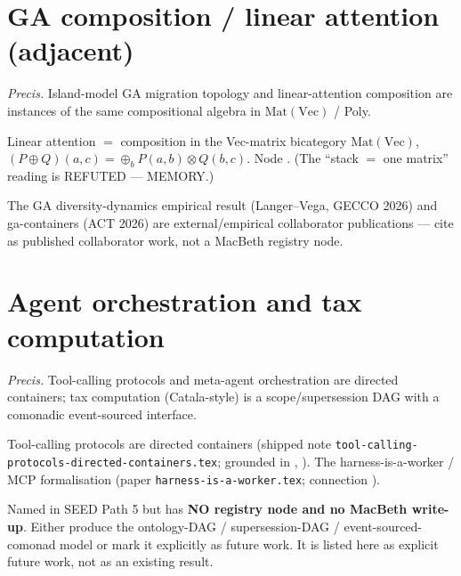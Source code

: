 \documentclass[11pt]{article}
\begin{document}
\section{GA composition / linear attention (adjacent)}
\emph{Precis.} Island-model GA migration topology and linear-attention composition are instances of
the same compositional algebra in $\mathrm{Mat}(\mathrm{Vec})$ / Poly.

\begin{theorem}
Linear attention $=$ composition in the Vec-matrix bicategory $\mathrm{Mat}(\mathrm{Vec})$,
$(P\oplus Q)(a,c)=\oplus_b P(a,b)\otimes Q(b,c)$. Node . (The
``stack $=$ one matrix'' reading is REFUTED --- MEMORY.)
\end{theorem}

\begin{remark}
The GA diversity-dynamics empirical result (Langer--Vega, GECCO 2026) and ga-containers (ACT 2026)
are external/empirical collaborator publications --- cite as published collaborator work, not a
MacBeth registry node.
\end{remark}

\section{Agent orchestration and tax computation}
\emph{Precis.} Tool-calling protocols and meta-agent orchestration are directed containers; tax
computation (Catala-style) is a scope/supersession DAG with a comonadic event-sourced interface.

\begin{remark}
Tool-calling protocols are directed containers (shipped note
\texttt{tool-calling-protocols-directed-containers.tex}; grounded in ,
). The harness-is-a-worker / MCP formalisation (paper \texttt{harness-is-a-worker.tex};
connection ).
\end{remark}

\begin{flag}
Named in SEED Path 5 but has \textbf{NO registry node and no MacBeth write-up}. Either produce the
ontology-DAG / supersession-DAG / event-sourced-comonad model or mark it explicitly as future work.
It is listed here as explicit future work, not as an existing result.
\end{flag}
\end{document}
